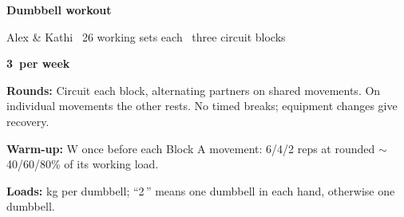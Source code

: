 \documentclass[10pt,a4paper]{article}
\begin{document}
\vspace*{1mm}
\fontsize{10.3pt}{12pt}\selectfont
\begin{minipage}[c]{0.76\linewidth}
{\fontsize{20}{23}\selectfont\bfseries Dumbbell workout}\par
{\color{muted}Alex \& Kathi \textbullet\ 26 working sets each \textbullet\ three circuit blocks}
\end{minipage}\hfill
\begin{minipage}[c]{0.23\linewidth}\raggedleft\bfseries 3\texttimes\ per week\end{minipage}
\vspace{1.2mm}
{\color{muted}
\textbf{Rounds:} Circuit each block, alternating partners on shared movements. On individual movements the other rests. No timed breaks; equipment changes give recovery.\par
\textbf{Warm-up:} W once before each Block A movement: 6/4/2 reps at rounded $\sim$40/60/80\% of its working load.\par
\textbf{Loads:} kg per dumbbell; ``2\,\texttimes'' means one dumbbell in each hand, otherwise one dumbbell.\par}
\vspace{1.0mm}
\end{document}
